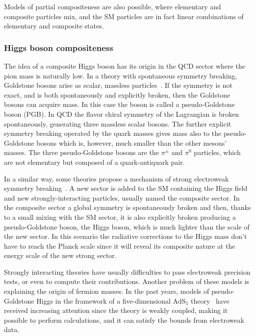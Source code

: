 Models of partial compositeness are also possible, where elementary and composite particles mix, and the SM particles are in fact linear combinations of elementary and composite states.

\subsubsection{Higgs boson compositeness}
The idea of a composite Higgs boson has its origin in the QCD sector where the pion mass is naturally low. In a theory with spontaneous symmetry breaking, Goldstone bosons arise as scalar, massless particles~\cite{PhysRev.127.965}. If the symmetry is not exact, and is both spontaneously and explicitly broken, then the Goldstone bosons can acquire mass. In this case the boson is called a pseudo-Goldstone boson (PGB). 
In QCD the flavor chiral symmetry of the Lagrangian is broken spontaneously, generating three massless scalar bosons. The further explicit symmetry breaking operated by the quark masses gives mass also to the pseudo-Goldstone bosons which is, however, much smaller than the other mesons' masses. The three pseudo-Goldstone bosons are the $\pi^{\pm}$ and $\pi^0$ particles, which are not elementary but composed of a quark-antiquark pair.

In a similar way, some theories propose a mechanism of strong electroweak symmetry breaking~\cite{Kaplan1984187}. A new sector is added to the SM containing the Higgs field and new strongly-interacting particles, usually named the composite sector. In the composite sector a global symmetry is spontaneously broken and then, thanks to a small mixing with the SM sector, it is also explicitly broken producing a pseudo-Goldstone boson, the Higgs boson, which is much lighter than the scale of the new sector.
In this scenario the radiative corrections to the Higgs mass don't have to reach the Planck scale since it will reveal its composite nature at the energy scale of the new strong sector.

Strongly interacting theories have usually difficulties to pass electroweak precision tests, or even to compute their contributions. Another problem of these models is explaining the origin of fermion masses.
In the past years, models of pseudo-Goldstone Higgs in the framework of a five-dimensional $\text{AdS}_5$ theory~\cite{ED1,Agashe:2004rs}
 have received increasing attention since the theory is weakly coupled, making it possible to perform calculations, and it can satisfy the bounds from electroweak data.

